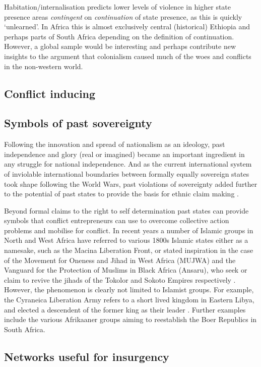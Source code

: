 \documentclass[12pt]{article}
\begin{document}
\begin{multicols}{2}
Habitation/internalisation predicts lower levels of violence in higher state
presence areas \textit{contingent} on \textit{continuation} of state presence,
as this is quickly `unlearned'. In Africa this is almost exclusively central
(historical) Ethiopia and perhaps parts of South Africa depending on the
definition of continuation. However, a global sample would be interesting and
perhaps contribute new insights to the argument that colonialism caused much of
the woes and conflicts in the non-western world.


\subsection{Conflict inducing}

\subsection{Symbols of past sovereignty}

Following the innovation and spread of nationalism as an ideology, past
independence and glory (real or imagined) became an important ingredient in any
struggle for national independence. And as the current international system of
inviolable international boundaries between formally equally sovereign states
took shape following the World Wars, past violations of sovereignty added
further to the potential of past states to provide the basis for ethnic claim
making \citep{Ahram2019, Shelef2016}. 

Beyond formal claims to the right to self determination past states can provide
symbols that conflict entrepreneurs can use to overcome collective action
problems and mobilise for conflict. In recent years a number of Islamic groups
in North and West Africa have referred to various 1800s Islamic states either as
a namesake, such as the Macina Liberation Front, or stated inspiration in the
case of the Movement for Oneness and Jihad in West Africa (MUJWA) and the
Vanguard for the Protection of Muslims in Black Africa (Ansaru), who seek or
claim to revive the jihads of the Tokolor and Sokoto Empires respectively
\citep{Zenn2015}. However, the phenomenon is clearly not limited to Islamist
groups. For example, the Cyraneica Liberation Army refers to a short lived
kingdom in Eastern Libya, and elected a descendent of the former king as their
leader \citep{Ahram2019}. Further examples include the various Afrikaaner groups
aiming to reestablish the Boer Republics in South Africa.

\subsection{Networks useful for insurgency}


\end{multicols}
\end{document}
